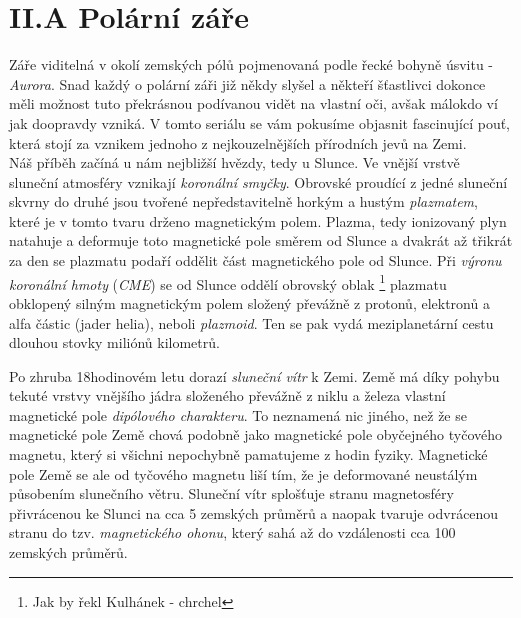 \documentclass{../../../../style/mkimain}
\begin{document}
\section*{II.A Polární záře}
Záře viditelná v okolí zemských pólů pojmenovaná podle řecké bohyně úsvitu - \emph{Aurora}. 
Snad každý o polární záři již někdy slyšel a někteří šťastlivci dokonce měli možnost 
tuto překrásnou podívanou vidět na vlastní oči, avšak málokdo ví jak doopravdy vzniká. 
V tomto seriálu se vám pokusíme objasnit fascinující pouť, která stojí za vznikem jednoho
 z nejkouzelnějších přírodních jevů na Zemi.  
\\

Náš příběh začíná u nám nejbližší hvězdy, tedy u Slunce. Ve vnější vrstvě sluneční atmosféry 
vznikají \emph{koronální smyčky}. Obrovské  proudící z jedné sluneční skvrny do 
druhé jsou tvořené nepředstavitelně horkým a hustým \emph{plazmatem}, které je v tomto tvaru drženo magnetickým polem.
Plazma, tedy ionizovaný plyn natahuje a deformuje toto magnetické pole směrem od Slunce a 
dvakrát až třikrát za den se plazmatu podaří oddělit část magnetického pole od Slunce. 
Při \emph{výronu koronální hmoty} (\emph{CME}) se od Slunce oddělí obrovský oblak \footnote[1]{Jak by řekl Kulhánek - chrchel} plazmatu obklopený silným 
magnetickým polem složený převážně z protonů, elektronů a alfa částic (jader helia), neboli \emph{plazmoid}.
Ten se pak vydá meziplanetární cestu dlouhou stovky miliónů kilometrů. 

Po zhruba 18hodinovém letu dorazí \emph{sluneční vítr} k Zemi. Země má díky pohybu tekuté vrstvy 
vnějšího jádra složeného převážně z niklu a železa vlastní magnetické pole \emph{dipólového charakteru}.
To neznamená nic jiného, než že se magnetické pole Země chová podobně jako magnetické pole 
obyčejného tyčového magnetu, který si všichni nepochybně pamatujeme z hodin fyziky. Magnetické pole Země
se ale od tyčového magnetu liší tím, že je deformované neustálým působením slunečního větru. Sluneční 
vítr splošťuje stranu magnetosféry přivrácenou ke Slunci na cca 5 zemských průměrů a naopak 
tvaruje odvrácenou stranu do tzv. \emph{magnetického ohonu}, který sahá až do vzdálenosti cca 
100 zemských průměrů.
\end{document}
